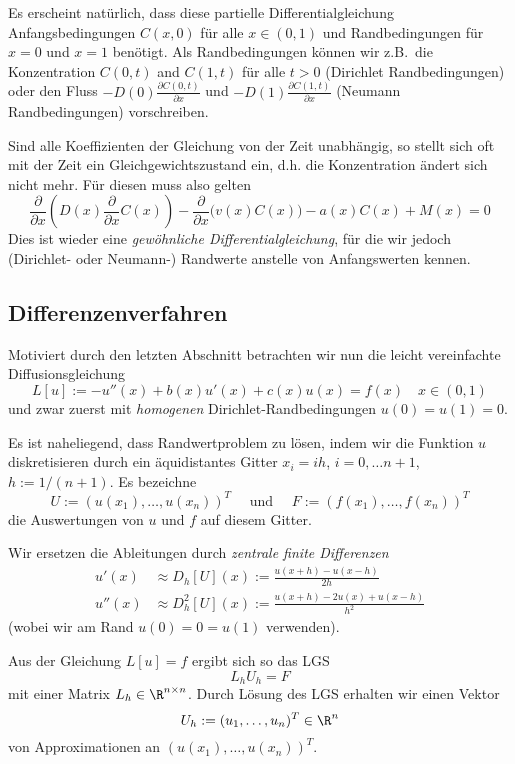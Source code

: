 \documentclass[
]{mycourse}
\theoremstyle{mythm}
\theoremstyle{break}
\begin{document}
Es erscheint natürlich, dass diese partielle Differentialgleichung Anfangsbedingungen 
$C(x,0)$ für alle $x\in (0,1)$ und Randbedingungen für $x=0$ und $x=1$ benötigt. 
Als Randbedingungen können wir z.B.\ die Konzentration $C(0,t)$ and $C(1,t)$ für alle $t>0$
(Dirichlet Randbedingungen) oder den Fluss  $-D(0)\frac{\partial C(0,t)}{\partial x}$ und $-D(1)\frac{\partial C(1,t)}{\partial x}$ (Neumann Randbedingungen) vorschreiben.

Sind alle Koeffizienten der Gleichung von der Zeit unabhängig, so stellt sich oft 
mit der Zeit ein Gleichgewichtszustand ein, d.h. die Konzentration ändert sich nicht mehr.
Für diesen muss also gelten 
\[
\frac{\partial}{\partial x} \left( D(x) \frac{\partial}{\partial x} C(x)\right) - \frac{\partial}{\partial x} \Big(v(x) C(x)\Big) - a(x)C(x) + M(x)=0
\]
Dies ist wieder eine \emph{gewöhnliche Differentialgleichung}, für die wir jedoch 
(Dirichlet- oder Neumann-) Randwerte anstelle von Anfangswerten kennen.

\subsection{Differenzenverfahren}\label{subsect:FD_1D_BVP}

Motiviert durch den letzten Abschnitt betrachten wir nun
die leicht vereinfachte Diffusionsgleichung
\[
L[u]:=-u''(x) + b(x)u'(x) + c(x)u(x)=f(x) \quad x\in (0,1)
\]
und zwar zuerst mit \emph{homogenen} Dirichlet-Randbedingungen $u(0)=u(1)=0$. 

Es ist naheliegend, dass Randwertproblem zu lösen, indem wir die Funktion
$u$ diskretisieren durch ein äquidistantes Gitter $x_i=ih$, $i=0,\ldots n+1$, $h:=1/(n+1)$. 
Es bezeichne
\[
U:=(u(x_1),\ldots,u(x_{n}))^T\quad \mbox{ und } \quad F:=(f(x_1),\ldots,f(x_{n}))^T
\]
die Auswertungen von $u$ und $f$ auf diesem Gitter.

Wir ersetzen die Ableitungen durch \emph{zentrale finite Differenzen}
\begin{align*}
u'(x) &\approx D_h[U](x):=\frac{u(x+h)-u(x-h)}{2h}\\
u''(x)& \approx D^2_h[U](x):= \frac{u(x+h)-2u(x)+u(x-h)}{h^2}
\end{align*}
(wobei wir am Rand $u(0)=0=u(1)$ verwenden).

Aus der Gleichung $L[u]=f$ ergibt sich so das LGS
\[
L_h U_h = F
\]
mit einer Matrix $L_h\in \R^{n \times n}$. Durch Lösung des LGS erhalten wir einen Vektor
\[
U_h:=(u_1,\ldots, u_{n})^T\in \R^n
\]
von Approximationen an $(u(x_1),\ldots,u(x_{n}))^T$.
\end{document}
